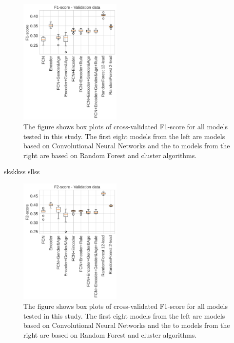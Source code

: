 \begin{figure}[hpbt!]
    \centering
    \includegraphics[width=0.45\textwidth]{Figures/F_score_val.png}
    \caption{The figure shows box plots of cross-validated F1-score for all models tested in this study. The first eight models from the left are models based on Convolutional Neural Networks and the to models from the right are based on Random Forest and cluster algorithms.}
    \label{fig:my_label}
\end{figure}
skskkss
sllss

\begin{figure}[hb!]
    \centering
    \includegraphics[width=0.45\textwidth]{Figures/F2_score_val.png}
    \caption{The figure shows box plots of cross-validated F1-score for all models tested in this study. The first eight models from the left are models based on Convolutional Neural Networks and the to models from the right are based on Random Forest and cluster algorithms.}
    \label{fig:my_label}
\end{figure}

